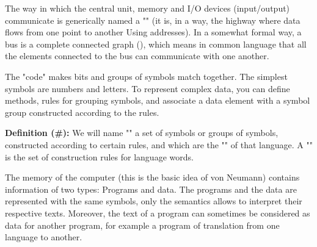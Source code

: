 	The way in which the central unit, memory and I/O devices (input/output) communicate is generically named a "" (it is, in a way, the highway where data flows from one point to another Using addresses). In a somewhat formal way, a bus is a complete connected graph (), which means in common language that all the elements connected to the bus can communicate with one another.
	\begin{tcolorbox}[title=Remark,colframe=black,arc=10pt]
	The "code" makes bits and groups of symbols match together. The simplest symbols are numbers and letters. To represent complex data, you can define methods, rules for grouping symbols, and associate a data element with a symbol group constructed according to the rules.
	\end{tcolorbox}
	\textbf{Definition (\#\mydef):} We will name "" a set of symbols or groups of symbols, constructed according to certain rules, and which are the "" of that language. A "" is the set of construction rules for language words.
	
	The memory of the computer (this is the basic idea of von Neumann) contains information of two types: Programs and data. The programs and the data are represented with the same symbols, only the semantics allows to interpret their respective texts. Moreover, the text of a program can sometimes be considered as data for another program, for example a program of translation from one language to another.
	
